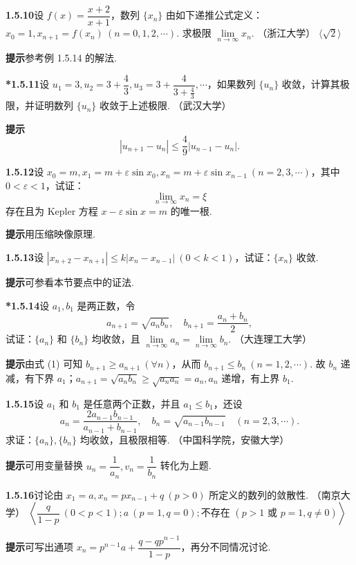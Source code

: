 \documentclass[UTF8, 12pt, fontset=fandol, oneside]{ctexart}
\begin{document}
\noindent\textbf{1.5.10}\quad 设 $f(x)=\dfrac{x+2}{x+1}$，数列 $\{x_n\}$ 由如下递推公式定义：$x_0=1,x_{n+1}=f(x_n)\ (n=0,1,2,\cdots)$. 求极限 $\lim\limits_{n\to\infty}x_n$. （浙江大学） \hfill $\langle\sqrt2\rangle$

\noindent\textbf{提示}\quad 参考例 1.5.14 的解法.

\noindent\textbf{*1.5.11}\quad 设 $u_1=3,u_2=3+\dfrac43,u_3=3+\dfrac4{3+\frac43},\cdots$，如果数列 $\{u_n\}$ 收敛，计算其极限，并证明数列 $\{u_n\}$ 收敛于上述极限. （武汉大学）

\noindent\textbf{提示}\quad
\[
  |u_{n+1}-u_n|\le \frac49|u_{n-1}-u_n|.
\]

\noindent\textbf{1.5.12}\quad 设 $x_0=m,x_1=m+\varepsilon\sin x_0,x_n=m+\varepsilon\sin x_{n-1}\ (n=2,3,\cdots)$，其中 $0<\varepsilon<1$，试证：
\[
  \lim_{n\to\infty}x_n=\xi
\]
存在且为 Kepler 方程 $x-\varepsilon\sin x=m$ 的唯一根.

\noindent\textbf{提示}\quad 用压缩映像原理.

\noindent\textbf{1.5.13}\quad 设 $|x_{n+2}-x_{n+1}|\le k|x_n-x_{n-1}|\ (0<k<1)$，试证：$\{x_n\}$ 收敛.

\noindent\textbf{提示}\quad 可参看本节要点中的证法.

\noindent\textbf{*1.5.14}\quad 设 $a_1,b_1$ 是两正数，令
\[
  a_{n+1}=\sqrt{a_nb_n},\quad b_{n+1}=\frac{a_n+b_n}{2},
\tag{1}
\]
试证：$\{a_n\}$ 和 $\{b_n\}$ 均收敛，且 $\lim\limits_{n\to\infty}a_n=\lim\limits_{n\to\infty}b_n$. （大连理工大学）

\noindent\textbf{提示}\quad 由式 (1) 可知 $b_{n+1}\ge a_{n+1}\ (\forall n)$，从而 $b_{n+1}\le b_n\ (n=1,2,\cdots)$. 故 $b_n$ 递减，有下界 $a_1$；$a_{n+1}=\sqrt{a_nb_n}\ge \sqrt{a_na_n}=a_n,a_n$ 递增，有上界 $b_1$.

\noindent\textbf{1.5.15}\quad 设 $a_1$ 和 $b_1$ 是任意两个正数，并且 $a_1\le b_1$，还设
\[
  a_n=\frac{2a_{n-1}b_{n-1}}{a_{n-1}+b_{n-1}},\quad
  b_n=\sqrt{a_{n-1}b_{n-1}}\quad (n=2,3,\cdots).
\]
求证：$\{a_n\},\{b_n\}$ 均收敛，且极限相等. （中国科学院，安徽大学）

\noindent\textbf{提示}\quad 可用变量替换 $u_n=\dfrac1{a_n},v_n=\dfrac1{b_n}$ 转化为上题.

\noindent\textbf{1.5.16}\quad 讨论由 $x_1=a,x_n=px_{n-1}+q\ (p>0)$ 所定义的数列的敛散性. （南京大学） \hfill $\left\langle\dfrac q{1-p}\ (0<p<1);a\ (p=1,q=0);\text{不存在 }(p>1\text{ 或 }p=1,q\ne0)\right\rangle$

\noindent\textbf{提示}\quad 可写出通项 $x_n=p^{n-1}a+\dfrac{q-qp^{n-1}}{1-p}$，再分不同情况讨论.
\end{document}
